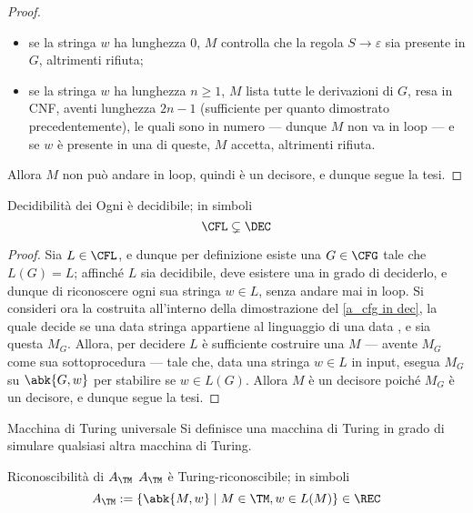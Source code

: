 \documentclass[a4paper, 12pt]{report}
\begin{document}
\begin{proof}
        \begin{itemize}
            \item se la stringa $w$ ha lunghezza 0, $M$ controlla che la regola $S \to \varepsilon$ sia presente in $G$, altrimenti rifiuta;
            \item se la stringa $w$ ha lunghezza $n \ge 1$, $M$ lista tutte le derivazioni di $G$, resa in CNF, aventi lunghezza $2n - 1$ (sufficiente per quanto dimostrato precedentemente), le quali sono in numero  --- dunque $M$ non va in loop --- e se $w$ è presente in una di queste, $M$ accetta, altrimenti rifiuta.
        \end{itemize}

        Allora $M$ non può andare in loop, quindi è un decisore, e dunque segue la tesi.
    \end{proof}

    \begin{framedcor}[label={cfl subset dec}]{Decidibilità dei \CFL}
        Ogni \CFL è decidibile; in simboli $$\CFL \subsetneq \DEC$$
    \end{framedcor}

    \begin{proof}
        Sia $L \in \CFL$, e dunque per definizione esiste una $G \in \CFG$ tale che $L(G) = L$; affinché $L$ sia decidibile, deve esistere una \TM in grado di deciderlo, e dunque di riconoscere ogni sua stringa $w \in L$, senza andare mai in loop. Si consideri ora la \TM costruita all'interno della dimostrazione del \cref{a_cfg in dec}, la quale decide se una data stringa appartiene al linguaggio di una data \CFG, e sia questa $M_G$. Allora, per decidere $L$ è sufficiente costruire una \TM $M$ --- avente $M_G$ come sua sottoprocedura --- tale che, data una stringa $w \in L$ in input, esegua $M_G$ su $\abk{G, w}$ per stabilire se $w \in L(G)$. Allora $M$ è un decisore poiché $M_G$ è un decisore, e dunque segue la tesi.
    \end{proof}

    \begin{frameddefn}{Macchina di Turing universale}
        Si definisce  una macchina di Turing in grado di simulare qualsiasi altra macchina di Turing.
    \end{frameddefn}

    \begin{framedthm}[label={a_tm in rec}]{Riconoscibilità di $A_\TM$}
        $A_\TM$ è Turing-riconoscibile; in simboli $$A_\TM := \{\abk{M, w} \mid M \in \TM, w \in L(M)\} \in \REC$$
    \end{framedthm}
\end{document}
